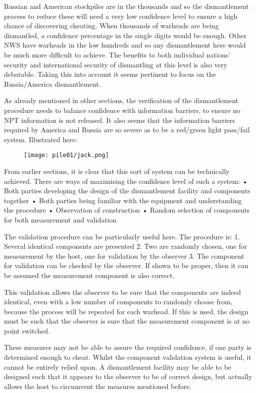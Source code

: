 \documentclass[twoside,titlepage,11pt,twocolumn,a4paper]{article}
\begin{document}
Russian and American stockpiles are in the thousands and so the
dismantlement process to reduce these will need a very low confidence
level to ensure a high chance of discovering cheating. When thousands
of warheads are being dismantled, a confidence percentage in the
single digits would be enough. Other NWS have warheads in the low
hundreds and so any dismantlement here would be much more difficult to
achieve.  The benefits to both individual nations' security and
international security of dismantling at this level is also very
debatable. Taking this into account it seems pertinent to focus on the
Russia/America dismantlement.

As already mentioned in other sections, the verification of the
dismantlement procedure needs to balance confidence with information
barriers, to ensure no NPT information is not released. It also seems
that the information barriers required by America and Russia are so
severe as to be a red/green light pass/fail system. Illustrated here:

\begin{figure}
  \texttt{[image: pile01/jack.png]}
\end{figure}

From earlier sections, it is clear that this sort of system can be
technically achieved. There are ways of maximising the confidence
level of such a system: • Both parties developing the design of the
dismantlement facility and components together • Both parties being
familiar with the equipment and understanding the procedure •
Observation of construction • Random selection of components for both
measurement and validation

The validation procedure can be particularly useful here. The
procedure is: 1. Several identical components are presented 2. Two are
randomly chosen, one for measurement by the host, one for validation
by the observer 3. The component for validation can be checked by the
observer. If shown to be proper, then it can be assumed the
measurement component is also correct.

This validation allows the observer to be sure that the components are
indeed identical, even with a low number of components to randomly
choose from, because the process will be repeated for each warhead. If
this is used, the design must be such that the observer is sure that
the measurement component is at no point switched.

These measures may not be able to assure the required confidence, if
one party is determined enough to cheat. Whilst the component
validation system is useful, it cannot be entirely relied upon. A
dismantlement facility may be able to be designed such that it appears
to the observer to be of correct design, but actually allows the host
to circumvent the measures mentioned before.
\end{document}
